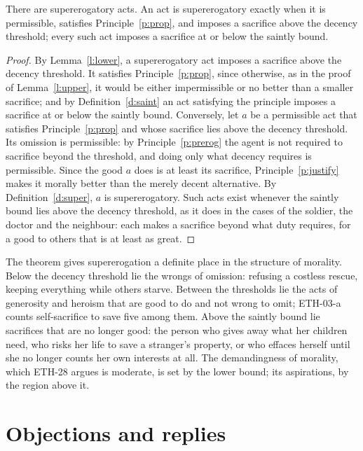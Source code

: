 \documentclass{situationist-preprint}
\begin{document}
\begin{theorem}\label{t:main}
There are supererogatory acts. An act is supererogatory exactly when it is permissible, satisfies Principle~\ref{p:prop}, and imposes a sacrifice above the decency threshold; every such act imposes a sacrifice at or below the saintly bound.
\end{theorem}

\begin{proof}
By Lemma~\ref{l:lower}, a supererogatory act imposes a sacrifice above the decency threshold. It satisfies Principle~\ref{p:prop}, since otherwise, as in the proof of Lemma~\ref{l:upper}, it would be either impermissible or no better than a smaller sacrifice; and by Definition~\ref{d:saint} an act satisfying the principle imposes a sacrifice at or below the saintly bound. Conversely, let $a$ be a permissible act that satisfies Principle~\ref{p:prop} and whose sacrifice lies above the decency threshold. Its omission is permissible: by Principle~\ref{p:prerog} the agent is not required to sacrifice beyond the threshold, and doing only what decency requires is permissible. Since the good $a$ does is at least its sacrifice, Principle~\ref{p:justify} makes it morally better than the merely decent alternative. By Definition~\ref{d:super}, $a$ is supererogatory. Such acts exist whenever the saintly bound lies above the decency threshold, as it does in the cases of the soldier, the doctor and the neighbour: each makes a sacrifice beyond what duty requires, for a good to others that is at least as great.
\end{proof}

The theorem gives supererogation a definite place in the structure of morality. Below the decency threshold lie the wrongs of omission: refusing a costless rescue, keeping everything while others starve. Between the thresholds lie the acts of generosity and heroism that are good to do and not wrong to omit; ETH-03-a counts self-sacrifice to save five among them. Above the saintly bound lie sacrifices that are no longer good: the person who gives away what her children need, who risks her life to save a stranger's property, or who effaces herself until she no longer counts her own interests at all. The demandingness of morality, which ETH-28 argues is moderate, is set by the lower bound; its aspirations, by the region above it.

\section{Objections and replies}
\end{document}

